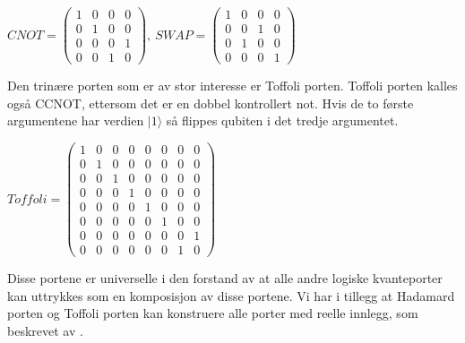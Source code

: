         \begin{center}
            \begin{math}
                CNOT = \begin{pmatrix}
                    1 & 0 & 0 & 0 \\
                    0 & 1 & 0 & 0 \\
                    0 & 0 & 0 & 1 \\
                    0 & 0 & 1 & 0
                \end{pmatrix},\ SWAP = \begin{pmatrix}
                    1 & 0 & 0 & 0 \\
                    0 & 0 & 1 & 0 \\
                    0 & 1 & 0 & 0 \\
                    0 & 0 & 0 & 1
                \end{pmatrix}
            \end{math}
        \end{center}
        Den trinære porten som er av stor interesse er Toffoli porten. Toffoli porten kalles også CCNOT, ettersom det er en dobbel kontrollert not. Hvis de to første argumentene har verdien $|1\rangle$ så flippes qubiten i det tredje argumentet.
        \begin{center}
            \begin{math}
                Toffoli = \begin{pmatrix}
                    1 & 0 & 0 & 0 & 0 & 0 & 0 & 0 \\
                    0 & 1 & 0 & 0 & 0 & 0 & 0 & 0 \\
                    0 & 0 & 1 & 0 & 0 & 0 & 0 & 0 \\
                    0 & 0 & 0 & 1 & 0 & 0 & 0 & 0 \\
                    0 & 0 & 0 & 0 & 1 & 0 & 0 & 0 \\
                    0 & 0 & 0 & 0 & 0 & 1 & 0 & 0 \\
                    0 & 0 & 0 & 0 & 0 & 0 & 0 & 1 \\
                    0 & 0 & 0 & 0 & 0 & 0 & 1 & 0
                \end{pmatrix}
            \end{math}
        \end{center}
        Disse portene er universelle i den forstand av at alle andre logiske kvanteporter kan uttrykkes som en komposisjon av disse portene. Vi har i tillegg at Hadamard porten og Toffoli porten kan konstruere alle porter med reelle innlegg, som beskrevet av \cite{dewolf2021quantum}.

